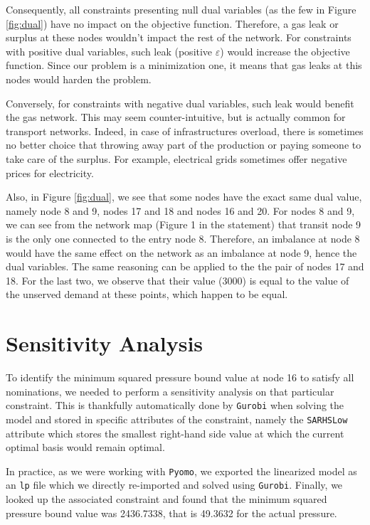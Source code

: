 \documentclass[a4paper, 12pt]{article}
\begin{document}
Consequently, all constraints presenting null dual variables (as the few in Figure \ref{fig:dual}) have no impact on the objective function. Therefore, a gas leak or surplus at these nodes wouldn't impact the rest of the network. For constraints with positive dual variables, such leak (positive $\varepsilon$) would increase the objective function. Since our problem is a minimization one, it means that gas leaks at this nodes would harden the problem.

Conversely, for constraints with negative dual variables, such leak would benefit the gas network. This may seem counter-intuitive, but is actually common for transport networks. Indeed, in case of infrastructures overload, there is sometimes no better choice that throwing away part of the production or paying \og{}someone\fg{} to take care of the surplus. For example, electrical grids sometimes offer negative prices for electricity.

Also, in Figure \ref{fig:dual}, we see that some nodes have the exact same dual value, namely node 8 and 9, nodes 17 and 18 and nodes 16 and 20. For nodes 8 and 9, we can see from the network map (Figure 1 in the statement) that transit node 9 is the only one connected to the entry node 8. Therefore, an imbalance at node 8 would have the same effect on the network as an imbalance at node 9, hence the dual variables. The same reasoning can be applied to the the pair of nodes 17 and 18. For the last two, we observe that their value (\num{3000}) is equal to the value of the unserved demand at these points, which happen to be equal.

\section{Sensitivity Analysis}

To identify the minimum squared pressure bound value at node 16 to satisfy all nominations, we needed to perform a sensitivity analysis on that particular constraint. This is thankfully automatically done by \texttt{Gurobi} when solving the model and stored in specific attributes of the constraint, namely the \texttt{SARHSLow} attribute which stores the smallest right-hand side value at which the current optimal basis would remain optimal.

In practice, as we were working with \texttt{Pyomo}, we exported the linearized model as an \texttt{lp} file which we directly re-imported and solved using \texttt{Gurobi}. Finally, we looked up the associated constraint and found that the minimum squared pressure bound value was \num{2436.7338}, that is \num{49.3632} for the actual pressure.
\end{document}
